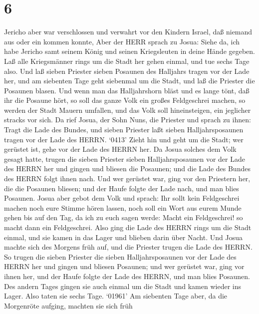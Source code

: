 \hypertarget{section-5}{%
\section{6}\label{section-5}}

 Jericho aber war verschlossen und verwahrt vor den Kindern
Israel, daß niemand aus oder ein kommen konnte,  Aber der
HERR sprach zu Josua: Siehe da, ich habe Jericho samt seinem König und
seinen Kriegsleuten in deine Hände gegeben.  Laß alle
Kriegsmänner rings um die Stadt her gehen einmal, und tue sechs Tage
also.  Und laß sieben Priester sieben Posaunen des Halljahrs
tragen vor der Lade her, und am siebenten Tage geht siebenmal um die
Stadt, und laß die Priester die Posaunen blasen.  Und wenn
man das Halljahrshorn bläst und es lange tönt, daß ihr die Posaune hört,
so soll das ganze Volk ein großes Feldgeschrei machen, so werden der
Stadt Mauern umfallen, und das Volk soll hineinsteigen, ein jeglicher
stracks vor sich.  Da rief Josua, der Sohn Nuns, die
Priester und sprach zu ihnen: Tragt die Lade des Bundes, und sieben
Priester laßt sieben Halljahrsposaunen tragen vor der Lade des HERRN.
 `0413' Zieht hin und geht um die Stadt; wer gerüstet ist,
gehe vor der Lade des HERRN her.  Da Josua solches dem Volk
gesagt hatte, trugen die sieben Priester sieben Halljahrsposaunen vor
der Lade des HERRN her und gingen und bliesen die Posaunen; und die Lade
des Bundes des HERRN folgt ihnen nach.  Und wer gerüstet
war, ging vor den Priestern her, die die Posaunen bliesen; und der Haufe
folgte der Lade nach, und man blies Posaunen.  Josua aber
gebot dem Volk und sprach: Ihr sollt kein Feldgeschrei machen noch eure
Stimme hören lassen, noch soll ein Wort aus eurem Munde gehen bis auf
den Tag, da ich zu euch sagen werde: Macht ein Feldgeschrei! so macht
dann ein Feldgeschrei.  Also ging die Lade des HERRN rings
um die Stadt einmal, und sie kamen in das Lager und blieben darin über
Nacht.  Und Josua machte sich des Morgens früh auf, und die
Priester trugen die Lade des HERRN.  So trugen die sieben
Priester die sieben Halljahrsposaunen vor der Lade des HERRN her und
gingen und bliesen Posaunen; und wer gerüstet war, ging vor ihnen her,
und der Haufe folgte der Lade des HERRN, und man blies Posaunen.
 Des andern Tages gingen sie auch einmal um die Stadt und
kamen wieder ins Lager. Also taten sie sechs Tage.  `01961'
Am siebenten Tage aber, da die Morgenröte aufging, machten sie sich früh
